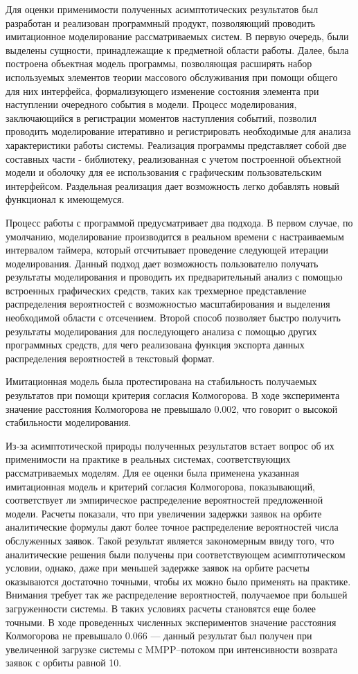 Для оценки применимости полученных асимптотических результатов был разработан и реализован программный продукт, позволяющий проводить имитационное моделирование рассматриваемых систем. В первую очередь, были выделены сущности, принадлежащие к предметной области работы. Далее, была построена объектная модель программы, позволяющая расширять набор используемых элементов теории массового обслуживания при помощи общего для них интерфейса, формализующего изменение состояния элемента при наступлении очередного события в модели. Процесс моделирования, заключающийся в регистрации моментов наступления событий, позволил проводить моделирование итеративно и регистрировать необходимые для анализа характеристики работы системы. Реализация программы представляет собой две составных части - библиотеку, реализованная с учетом построенной объектной модели и оболочку для ее использования с графическим пользовательским интерфейсом. Раздельная реализация дает возможность легко добавлять новый функционал к имеющемуся.  

Процесс работы с программой предусматривает два подхода. В первом случае, по умолчанию, моделирование производится в реальном времени с настраиваемым интервалом таймера, который отсчитывает проведение следующей итерации моделирования. Данный подход дает возможность пользователю получать результаты моделирования и проводить их предварительный анализ с помощью встроенных графических средств, таких как трехмерное представление распределения вероятностей с возможностью масштабирования и выделения необходимой области с отсечением. Второй способ позволяет быстро получить результаты моделирования для последующего анализа с помощью других программных средств, для чего реализована функция экспорта данных распределения вероятностей в текстовый формат. 

Имитационная модель была протестирована на стабильность получаемых результатов при помощи критерия согласия Колмогорова. В ходе эксперимента значение расстояния Колмогорова не превышало 0.002, что говорит о высокой стабильности моделирования.

Из-за асимптотической природы полученных результатов встает вопрос об их применимости на практике в реальных системах, соответствующих рассматриваемых моделям. Для ее оценки была применена указанная имитационная модель и критерий согласия Колмогорова, показывающий, соответствует ли эмпирическое распределение вероятностей предложенной модели. Расчеты показали, что при увеличении задержки заявок на орбите аналитические формулы дают более точное распределение вероятностей числа обслуженных заявок. Такой результат является закономерным ввиду того, что аналитические решения были получены при соответствующем асимптотическом условии, однако, даже при меньшей задержке заявок на орбите расчеты оказываются достаточно точными, чтобы их можно было применять на практике. Внимания требует так же распределение вероятностей, получаемое при большей загруженности системы. В таких условиях расчеты становятся еще более точными. В ходе проведенных численных экспериментов значение расстояния Колмогорова не превышало 0.066 --- данный результат был получен при увеличенной загрузке системы с MMPP--потоком при интенсивности возврата заявок с орбиты равной 10.

